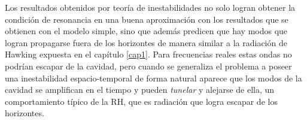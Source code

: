 Los resultados obtenidos por teor\'{i}a de inestabilidades no solo logran obtener la condici\'{o}n de resonancia en una buena aproximaci\'{o}n con los resultados que se obtienen con el modelo simple, sino que adem\'{a}s predicen que hay modos que logran propagarse fuera de los horizontes de manera similar a la radiaci\'{o}n de Hawking expuesta en el cap\'{i}tulo \ref{cap1}. Para frecuencias reales estas ondas no podr\'{i}an escapar de la cavidad, pero cuando se generaliza el problema a poseer una inestabilidad espacio-temporal de forma natural aparece que los modos de la cavidad se amplifican en el tiempo y pueden \textit{tunelar} y alejarse de ella, un comportamiento t\'{i}pico de la RH, que es  radiaci\'{o}n que logra escapar de los horizontes.\\
